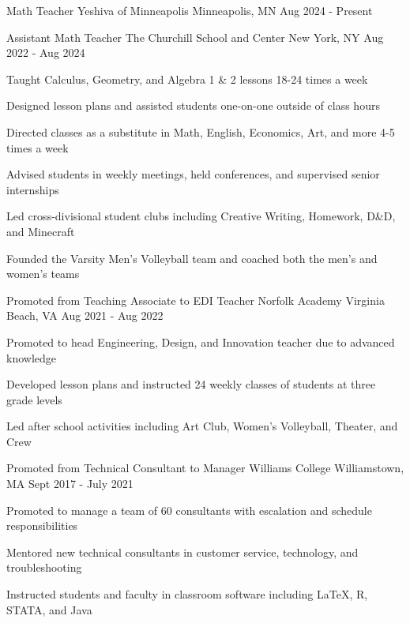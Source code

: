 \begin{cventries}
  \cventry
  {Math Teacher}
  {Yeshiva of Minneapolis}
  {Minneapolis, MN}
  {Aug 2024 - Present}
  {}

  \cventry
  {Assistant Math Teacher}
  {The Churchill School and Center}
  {New York, NY}
  {Aug 2022 - Aug 2024}
  {
    \begin{cvitems}
      \item {Taught Calculus, Geometry, and Algebra 1 \& 2 lessons 18-24 times a week}
      \item {Designed lesson plans and assisted students one-on-one outside of class hours}
      \item {Directed classes as a substitute in Math, English, Economics, Art, and more 4-5 times a week}
      \item {Advised students in weekly meetings, held conferences, and supervised senior internships}
      \item {Led cross-divisional student clubs including Creative Writing, Homework, D\&D, and Minecraft}
      \item {Founded the Varsity Men's Volleyball team and coached both the men's and women's teams}
    \end{cvitems}
  }

  \cventry
  {Promoted from Teaching Associate to EDI Teacher}
  {Norfolk Academy}
  {Virginia Beach, VA}
  {Aug 2021 - Aug 2022}
  {
    \begin{cvitems}
      \item {Promoted to head Engineering, Design, and Innovation teacher due to advanced knowledge}
      \item {Developed lesson plans and instructed 24 weekly classes of students at three grade levels}
      \item {Led after school activities including Art Club, Women's Volleyball, Theater, and Crew}
    \end{cvitems}
  }

  \cventry
  {Promoted from Technical Consultant to Manager}
  {Williams College}
  {Williamstown, MA}
  {Sept 2017 - July 2021}
  {
    \begin{cvitems}
      \item {Promoted to manage a team of 60 consultants with escalation and schedule responsibilities}
      \item {Mentored new technical consultants in customer service, technology, and troubleshooting}
      \item {Instructed students and faculty in classroom software including LaTeX, R, STATA, and Java}
    \end{cvitems}
  }


\end{cventries}
